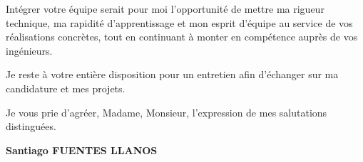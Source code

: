 \documentclass[10.5pt,a4paper]{article}
\begin{document}
Intégrer votre équipe serait pour moi l'opportunité de mettre ma rigueur technique, ma rapidité d'apprentissage et mon esprit d'équipe au service de vos réalisations concrètes, tout en continuant à monter en compétence auprès de vos ingénieurs.

Je reste à votre entière disposition pour un entretien afin d'échanger sur ma candidature et mes projets.

Je vous prie d'agréer, Madame, Monsieur, l'expression de mes salutations distinguées.

\vspace{1.2em}
\textbf{Santiago FUENTES LLANOS}
\end{document}
